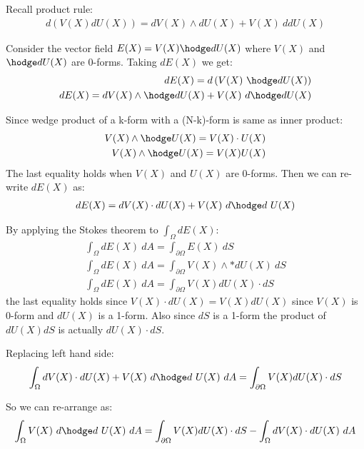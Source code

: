 \documentclass{birkjour}
\numberwithin{equation}{section}
\begin{document}
Recall product rule:
\begin{eqnarray} 
	d \left( V(X) d U(X) \right) = d V(X) \wedge d U(X) + V(X) \ d d U(X) \nonumber
\end{eqnarray} 
	
Consider the vector field $E(X) = V(X) \hodge d U(X)$ where $V(X)$ and $ \hodge d U(X)$ are 0-forms. Taking $d E(X)$ we get:
\begin{eqnarray} 
	d E(X) = d \left( V(X) \ \hodge dU(X) \right) \nonumber\\
	d E(X) = d V(X) \wedge \hodge d U(X) + V(X) \ d \hodge d U(X) \nonumber
\end{eqnarray} 

Since wedge product of a k-form with a (N-k)-form is same as inner product:
\begin{eqnarray} 
	V(X) \wedge \hodge U(X) = V(X) \cdot U(X) \nonumber\\
	V(X) \wedge \hodge U(X) = V(X) U(X) \nonumber
\end{eqnarray}
The last equality holds when $V(X)$ and $U(X)$ are 0-forms. Then we can re-write $d E(X)$ as:
\begin{eqnarray} 
	d E(X)  = dV(X) \cdot dU(X) + V(X) \ d \hodge d \ U(X) \nonumber
\end{eqnarray} 

By applying the Stokes theorem to $\int_{\Omega} d E(X)$:
\begin{eqnarray} 
\int_{\Omega}{ d E(X) \ dA } = \int_{\partial \Omega} { E(X) \ dS }   \nonumber\\
\int_{\Omega}{ d E(X) \ dA } = \int_{\partial \Omega} { V(X) \wedge *dU(X) \ dS } \nonumber\\
\int_{\Omega}{ d E(X) \ dA } = \int_{\partial \Omega} { V(X) dU(X) \cdot dS } \nonumber
\end{eqnarray} 
the last equality holds since $V(X) \cdot dU(X) = V(X) dU(X)$ since $V(X)$ is 0-form and $dU(X)$ is a 1-form. Also
since $dS$ is a 1-form the product of $dU(X) dS$ is actually $dU(X) \cdot dS$.

Replacing left hand side:
\begin{eqnarray} 
	\int_{\Omega}{dV(X) \cdot dU(X) + V(X) \ d \hodge d \ U(X) \ dA} = \int_{\partial \Omega} { V(X) dU(X) \cdot dS }
\end{eqnarray}

So we can re-arrange as:
\begin{eqnarray} 
\int_{\Omega} {V(X) \ d \hodge d \ U(X) \ dA} = \int_{\partial \Omega} {V(X) dU(X) \cdot dS} - \int_{\Omega} {dV(X) \cdot dU(X) \ dA}
\end{eqnarray}
\end{document}
